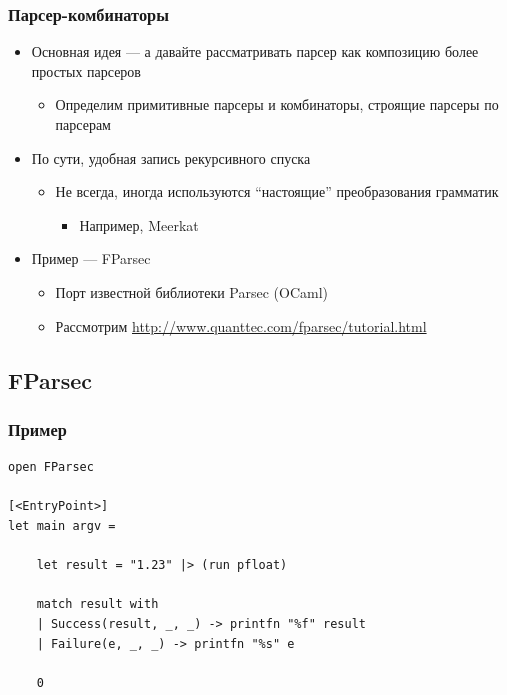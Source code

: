 \documentclass[xetex,mathserif,serif]{beamer}
\begin{document}
    \begin{frame}
        \frametitle{Парсер-комбинаторы}
        \begin{itemize}
            \item Основная идея --- а давайте рассматривать парсер как композицию более простых парсеров
            \begin{itemize}
                \item Определим примитивные парсеры и комбинаторы, строящие парсеры по парсерам
            \end{itemize}
            \item По сути, удобная запись рекурсивного спуска
            \begin{itemize}
                \item Не всегда, иногда используются ``настоящие'' преобразования грамматик
                \begin{itemize}
                    \item Например, Meerkat
                \end{itemize}
            \end{itemize}
            \item Пример --- FParsec
            \begin{itemize}
                \item Порт известной библиотеки Parsec (OCaml)
                \item Рассмотрим \url{http://www.quanttec.com/fparsec/tutorial.html}
            \end{itemize}
        \end{itemize}
    \end{frame}

    \subsection{FParsec}

    \begin{frame}[fragile]
        \frametitle{Пример}
        \begin{verbatim}
open FParsec

[<EntryPoint>]
let main argv =

    let result = "1.23" |> (run pfloat)

    match result with
    | Success(result, _, _) -> printfn "%f" result
    | Failure(e, _, _) -> printfn "%s" e

    0
        \end{verbatim}
    \end{frame}
\end{document}
